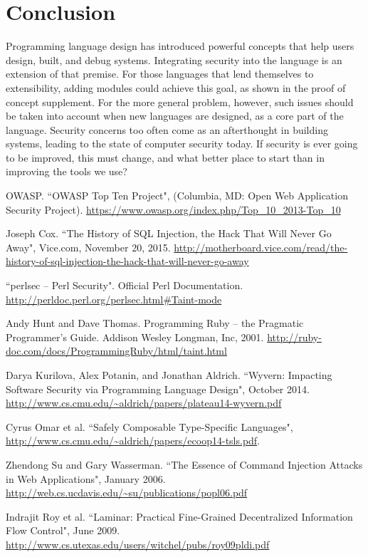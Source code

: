 \documentclass[twocolumn]{article}
\begin{document}
\section{Conclusion}
Programming language design has introduced powerful concepts that help users design, built, and debug systems.  Integrating security into the language is an extension of that premise.  For those languages that lend themselves to extensibility, adding modules could achieve this goal, as shown in the proof of concept supplement.  For the more general problem, however, such issues should be taken into account when new languages are designed, as a core part of the language.  Security concerns too often come as an afterthought in building systems, leading to the state of computer security today.  If security is ever going to be improved, this must change, and what better place to start than in improving the tools we use?


\begin{thebibliography}{9}

    OWASP.
    ``OWASP Top Ten Project", (Columbia, MD: Open Web Application Security Project).
    \url{https://www.owasp.org/index.php/Top_10_2013-Top_10}

    Joseph Cox.
    ``The History of SQL Injection, the Hack That Will Never Go Away",
    Vice.com, November 20, 2015.
    \url{http://motherboard.vice.com/read/the-history-of-sql-injection-the-hack-that-will-never-go-away}

    ``perlsec -- Perl Security".  Official Perl Documentation.
    \url{http://perldoc.perl.org/perlsec.html#Taint-mode}

    Andy Hunt and Dave Thomas.
    Programming Ruby -- the Pragmatic Programmer's Guide.
    Addison Wesley Longman, Inc, 2001.
    \url{http://ruby-doc.com/docs/ProgrammingRuby/html/taint.html}

    Darya Kurilova, Alex Potanin, and Jonathan Aldrich.
    ``Wyvern: Impacting Software Security via Programming Language Design",
    October 2014.
    \url{http://www.cs.cmu.edu/~aldrich/papers/plateau14-wyvern.pdf}

    Cyrus Omar et al.
    ``Safely Composable Type-Specific Languages",
    \url{http://www.cs.cmu.edu/~aldrich/papers/ecoop14-tsls.pdf}.

    Zhendong Su and Gary Wasserman.
    ``The Essence of Command Injection Attacks in Web Applications",
    January 2006.
    \url{http://web.cs.ucdavis.edu/~su/publications/popl06.pdf}

    Indrajit Roy et al.
    ``Laminar: Practical Fine-Grained Decentralized Information Flow Control",
    June 2009.
    \url{http://www.cs.utexas.edu/users/witchel/pubs/roy09pldi.pdf}


\end{thebibliography}
\end{document}
